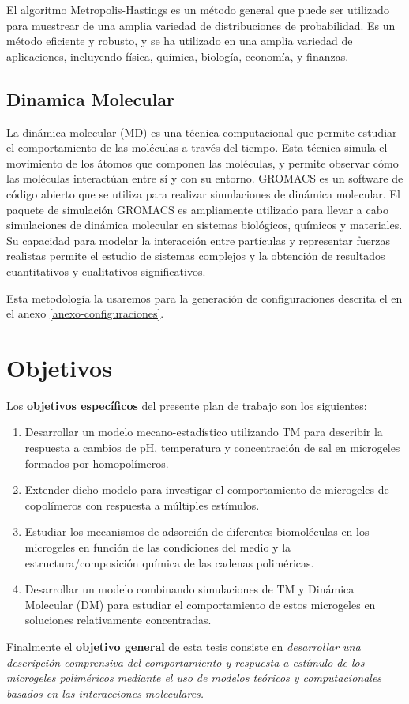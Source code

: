 El algoritmo Metropolis-Hastings es un m\'etodo general que puede ser utilizado para muestrear de una amplia variedad de distribuciones de probabilidad. Es un m\'etodo eficiente y robusto, y se ha utilizado en una amplia variedad de aplicaciones, incluyendo f\'isica, qu\'imica, biolog\'ia, econom\'ia, y finanzas. \addcite[(?)]

\subsection{Dinamica Molecular}

La din\'amica molecular (MD) es una t\'ecnica computacional que permite estudiar el comportamiento de las mol\'eculas a trav\'es del tiempo. Esta t\'ecnica simula el movimiento de los \'atomos que componen las mol\'eculas, y permite observar c\'omo las mol\'eculas interact\'uan entre s\'i y con su entorno.
GROMACS es un software de c\'odigo abierto que se utiliza para realizar simulaciones de din\'amica molecular. \addcite
El paquete de simulaci\'on GROMACS es ampliamente utilizado para llevar a cabo simulaciones de din\'amica molecular en sistemas biol\'ogicos, qu\'imicos y materiales. Su capacidad para modelar la interacci\'on entre part\'iculas y representar fuerzas realistas permite el estudio de sistemas complejos y la obtenci\'on de resultados cuantitativos y cualitativos significativos.

Esta metodolog\'ia la usaremos para la generaci\'on de configuraciones descrita el en el anexo \ref{anexo-configuraciones}.






\section{Objetivos}

Los {\bf objetivos específicos} del presente plan de trabajo son los siguientes:
%
\begin{enumerate}
\item Desarrollar un modelo mecano-estadístico utilizando TM para describir la respuesta a cambios de pH, temperatura y concentración de sal en microgeles formados por homopolímeros.%
\item Extender dicho modelo para investigar el comportamiento de microgeles de copolímeros con respuesta a múltiples estímulos.%
\item Estudiar los mecanismos de adsorción de diferentes biomoléculas en los microgeles en función de las condiciones del medio y la estructura/composición química de las cadenas poliméricas.%
\item Desarrollar un modelo combinando simulaciones de TM y Dinámica Molecular (DM) para estudiar el comportamiento de estos microgeles en soluciones relativamente concentradas.%
\end{enumerate}
%

Finalmente el \textbf{objetivo general} de esta tesis consiste en \emph{desarrollar una descripción comprensiva del comportamiento y respuesta a estímulo de los microgeles poliméricos mediante el uso de modelos teóricos y computacionales basados en las interacciones moleculares.}
